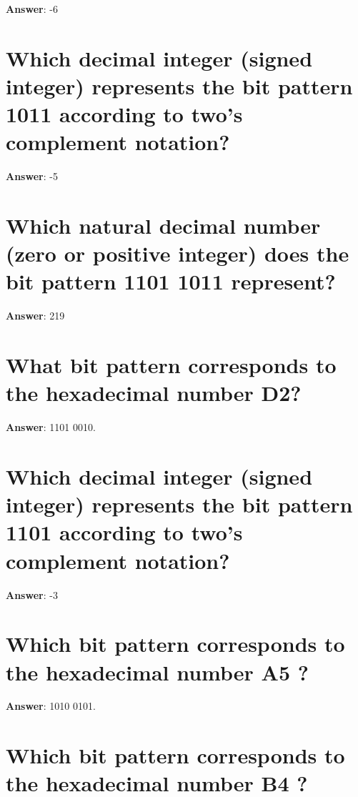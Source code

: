 \documentclass[a4paper,11pt,oneside]{book}
\begin{document}
\begin{sloppypar}
\label{q:377:sa:en:True}

\textbf{Answer}: -6



\section{Which decimal integer (signed integer) represents the bit pattern 1011 according to two{\textquoteright}s complement notation?}

\label{q:378:sa:en:True}

\textbf{Answer}: -5



\section{Which natural decimal number (zero or positive integer) does the bit pattern 1101 1011 represent?}

\label{q:379:sa:en:True}

\textbf{Answer}: 219



\section{What bit pattern corresponds to the hexadecimal number D2?}

\label{q:380:sa:en:True}

\textbf{Answer}: 1101 0010.



\section{Which decimal integer (signed integer) represents the bit pattern 1101 according to two{\textquoteright}s complement notation?}

\label{q:381:sa:en:True}

\textbf{Answer}: -3



\section{Which bit pattern corresponds to the hexadecimal number A5 ?}

\label{q:382:sa:en:True}

\textbf{Answer}: 1010 0101.



\section{Which bit pattern corresponds to the hexadecimal number B4 ?}


\end{sloppypar}
\end{document}
